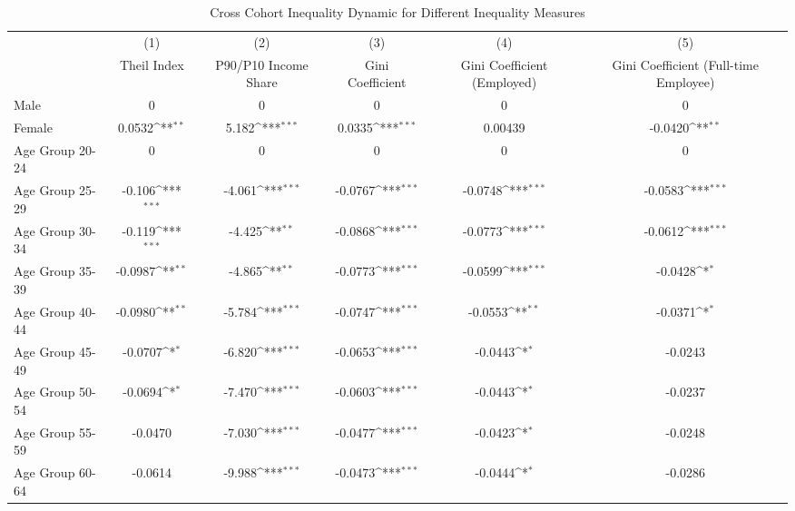 \begin{table}[htbp]\centering
\def\sym#1{\ifmmode^{#1}\else\(^{#1}\)\fi}
\caption{Cross Cohort Inequality Dynamic for Different Inequality Measures\label{reg3}}
\begin{tabular}{l*{5}{c}}
\hline\hline
                    &\multicolumn{1}{c}{(1)}&\multicolumn{1}{c}{(2)}&\multicolumn{1}{c}{(3)}&\multicolumn{1}{c}{(4)}&\multicolumn{1}{c}{(5)}\\
                    &\multicolumn{1}{c}{Theil Index}&\multicolumn{1}{c}{P90/P10 Income Share}&\multicolumn{1}{c}{Gini Coefficient}&\multicolumn{1}{c}{Gini Coefficient (Employed)}&\multicolumn{1}{c}{Gini Coefficient (Full-time Employee)}\\
\hline
Male                &           0         &           0         &           0         &           0         &           0         \\
Female              &      0.0532\sym{**} &       5.182\sym{***}&      0.0335\sym{***}&     0.00439         &     -0.0420\sym{**} \\
Age Group 20-24     &           0         &           0         &           0         &           0         &           0         \\
Age Group 25-29     &      -0.106\sym{***}&      -4.061\sym{***}&     -0.0767\sym{***}&     -0.0748\sym{***}&     -0.0583\sym{***}\\
Age Group 30-34     &      -0.119\sym{***}&      -4.425\sym{**} &     -0.0868\sym{***}&     -0.0773\sym{***}&     -0.0612\sym{***}\\
Age Group 35-39     &     -0.0987\sym{**} &      -4.865\sym{**} &     -0.0773\sym{***}&     -0.0599\sym{***}&     -0.0428\sym{*}  \\
Age Group 40-44     &     -0.0980\sym{**} &      -5.784\sym{***}&     -0.0747\sym{***}&     -0.0553\sym{**} &     -0.0371\sym{*}  \\
Age Group 45-49     &     -0.0707\sym{*}  &      -6.820\sym{***}&     -0.0653\sym{***}&     -0.0443\sym{*}  &     -0.0243         \\
Age Group 50-54     &     -0.0694\sym{*}  &      -7.470\sym{***}&     -0.0603\sym{***}&     -0.0443\sym{*}  &     -0.0237         \\
Age Group 55-59     &     -0.0470         &      -7.030\sym{***}&     -0.0477\sym{***}&     -0.0423\sym{*}  &     -0.0248         \\
Age Group 60-64     &     -0.0614         &      -9.988\sym{***}&     -0.0473\sym{***}&     -0.0444\sym{*}  &     -0.0286         \\

\end{tabular}
\end{table}
